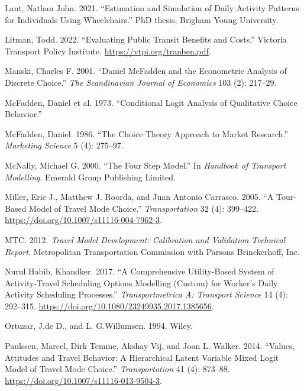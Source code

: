 \documentclass[12pt, oneside, openright]{byuthesis}
\newlength{\cslhangindent}
\newlength{\cslentryspacingunit} %
\newenvironment{CSLReferences}[2] %
 {%
  \setlength{\parindent}{0pt}
  \ifodd #1
  \let\oldpar\par
  \def\par{\hangindent=\cslhangindent\oldpar}
  \fi
  \setlength{\parskip}{#2\cslentryspacingunit}
 }%
 {}
\begin{document}
\begin{CSLReferences}{1}{0}
\leavevmode{}%
Lant, Nathan John. 2021. {``Estimation and Simulation of Daily Activity Patterns for Individuals Using Wheelchairs.''} PhD thesis, Brigham Young University.

\leavevmode{}%
Litman, Todd. 2022. {``Evaluating Public Transit Benefits and Costs.''} Victoria Transport Policy Institute. \url{https://vtpi.org/tranben.pdf}.

\leavevmode{}%
Manski, Charles F. 2001. {``Daniel McFadden and the Econometric Analysis of Discrete Choice.''} \emph{The Scandinavian Journal of Economics} 103 (2): 217--29.

\leavevmode{}%
McFadden, Daniel et al. 1973. {``Conditional Logit Analysis of Qualitative Choice Behavior.''}

\leavevmode{}%
McFadden, Daniel. 1986. {``The Choice Theory Approach to Market Research.''} \emph{Marketing Science} 5 (4): 275--97.

\leavevmode{}%
McNally, Michael G. 2000. {``The Four Step Model.''} In \emph{Handbook of Transport Modelling}. Emerald Group Publishing Limited.

\leavevmode{}%
Miller, Eric J., Matthew J. Roorda, and Juan Antonio Carrasco. 2005. {``A Tour-Based Model of Travel Mode Choice.''} \emph{Transportation} 32 (4): 399--422. \url{https://doi.org/10.1007/s11116-004-7962-3}.

\leavevmode{}%
MTC. 2012. \emph{Travel Model Development: Calibration and Validation Technical Report}. Metropolitan Transportation Commission with Parsons Brinckerhoff, Inc.

\leavevmode{}%
Nurul Habib, Khandker. 2017. {``A Comprehensive Utility-Based System of Activity-Travel Scheduling Options Modelling (Custom) for Worker's Daily Activity Scheduling Processes.''} \emph{Transportmetrica A: Transport Science} 14 (4): 292--315. \url{https://doi.org/10.1080/23249935.2017.1385656}.

\leavevmode{}%
Ortuzar, J.de D., and L. G.Willumsen. 1994. Wiley.

\leavevmode{}%
Paulssen, Marcel, Dirk Temme, Akshay Vij, and Joan L. Walker. 2014. {``Values, Attitudes and Travel Behavior: A Hierarchical Latent Variable Mixed Logit Model of Travel Mode Choice.''} \emph{Transportation} 41 (4): 873--88. \url{https://doi.org/10.1007/s11116-013-9504-3}.


\end{CSLReferences}
\end{document}
